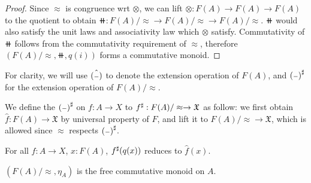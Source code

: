 \begin{proof}
Since $\approx$ is congruence wrt $\otimes$,
we can lift $\otimes : F(A) \to F(A) \to F(A)$ to the quotient to obtain
$\doubleplus : F(A) / \approx \to F(A) / \approx \to F(A) / \approx$.
$\doubleplus$ would also satisfy the unit laws and associativity law which $\otimes$ satisfy.
Commutativity of $\doubleplus$ follows from the commutativity requirement of $\approx$,
therefore $(F(A) / \approx, \doubleplus, q(i))$ forms a commutative monoid.
\end{proof}

For clarity, we will use $\hat{({\scriptstyle{-}})}$ to denote the extension operation of $F(A)$, 
and ${({\scriptstyle{-}})}^{\sharp}$ for the extension operation of $F(A) / \approx$.

\begin{definition}
We define the ${({\scriptstyle{-}})}^{\sharp}$ on $f : A \to X$ to ${f}^{\sharp} : F(A) / \approx \to \mathfrak{X}$ as follow:
we first obtain $\hat{f} : F(A) \to \mathfrak{X}$ by universal property of $F$, and lift it
to $F(A) / \approx \to \mathfrak{X}$, which is allowed since $\approx$ respects ${({\scriptstyle{-}})}^{\sharp}$.
\end{definition}

\begin{lemma}
    For all $f : A \to X$, $x : F(A)$, ${f}^{\sharp}(q(x))$ reduces to $\hat{f}(x)$.
\end{lemma}

\begin{proposition}
    $(F(A) / \approx,\eta_A)$ is the free commutative monoid on $A$.
\end{proposition}

